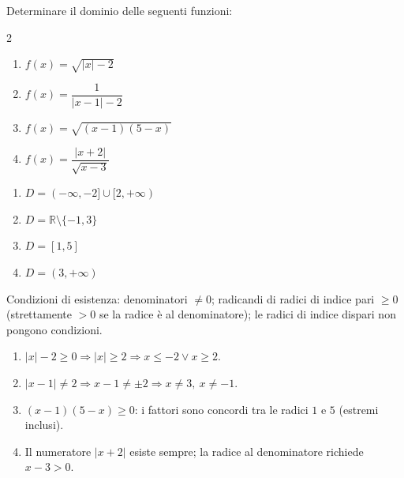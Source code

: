 
\begin{question}[ID=2.3, subtitle={Dominio con valore assoluto e composizioni}, difficulty=media, tags={dominio,assoluto,composizione}]
Determinare il dominio delle seguenti funzioni:

\begin{center}\begin{minipage}{0.92\linewidth}
\begin{multicols}{2}
\begin{enumerate}[leftmargin=3.2cm]
\item $f(x)=\sqrt{|x|-2}$
\item $f(x)=\dfrac{1}{|x-1|-2}$
\item $f(x)=\sqrt{(x-1)(5-x)}$
\item $f(x)=\dfrac{|x+2|}{\sqrt{x-3}}$
\end{enumerate}
\end{multicols}
\end{minipage}\end{center}
\begin{solution}
\begin{enumerate}
    \item $D=(-\infty,-2]\cup[2,+\infty)$
    \item $D=\mathbb{R}\setminus\{-1,3\}$
    \item $D=[1,5]$
    \item $D=(3,+\infty)$
\end{enumerate}
\end{solution}
\begin{explanation}
Condizioni di esistenza: denominatori $\neq0$; radicandi di radici di indice pari $\geq0$ (strettamente $>0$ se la radice è al denominatore); le radici di indice dispari non pongono condizioni.
\begin{enumerate}
    \item $|x|-2\geq0 \Rightarrow |x|\geq2 \Rightarrow x\leq-2 \vee x\geq2$.
    \item $|x-1|\neq2 \Rightarrow x-1\neq\pm2 \Rightarrow x\neq3,\ x\neq-1$.
    \item $(x-1)(5-x)\geq0$: i fattori sono concordi tra le radici $1$ e $5$ (estremi inclusi).
    \item Il numeratore $|x+2|$ esiste sempre; la radice al denominatore richiede $x-3>0$.
\end{enumerate}
\end{explanation}
\end{question}

